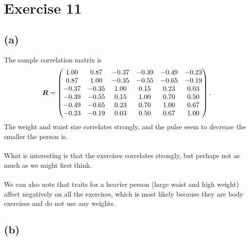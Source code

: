 
\section*{Exercise 11}
\label{sec:exericse-11}

\subsection*{(a)}
\label{sec:a-7}

The sample correlation matrix is
\begin{equation*}
  \bm{R} =
  \begin{pmatrix}
    1.00 &0.87 &-0.37 &-0.39 &-0.49 &-0.23 \\ 
    0.87 &1.00 &-0.35 &-0.55 &-0.65 &-0.19 \\ 
    -0.37 &-0.35 &1.00 &0.15 &0.23 &0.03 \\ 
    -0.39 &-0.55 &0.15 &1.00 &0.70 &0.50 \\ 
    -0.49 &-0.65 &0.23 &0.70 &1.00 &0.67 \\ 
    -0.23 &-0.19 &0.03 &0.50 &0.67 &1.00  
  \end{pmatrix}.
\end{equation*}
The weight and waist size correlates strongly, and the pulse seem to
decrease the smaller the person is. \\
\\
What is interesting is that the exercises correlates strongly, but
perhaps not as much as we might first think. \\
\\
We can also note that traits for a heavier person (large waist and high
weight) affect negatively on all the exercises, which is most likely
because they are body exercises and do not use any weights.

\subsection*{(b)}
\label{sec:b-10}

